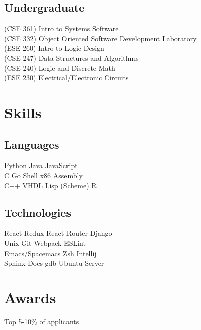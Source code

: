 \documentclass[]{deedy-resume-openfont}
\begin{document}
\begin{minipage}[t]{0.33\textwidth}
\subsection{Undergraduate}
(CSE 361) Intro to Systems Software\\
(CSE 332) Object Oriented Software Development Laboratory\\
(ESE 260) Intro to Logic Design\\
(CSE 247) Data Structures and Algorithms\\
(CSE 240) Logic and Discrete Math\\
(ESE 230) Electrical/Electronic Circuits\\
\sectionsep


\section{Skills}
\subsection{Languages}
Python \textbullet{} Java \textbullet{} JavaScript \\
C \textbullet{} Go \textbullet{} Shell \textbullet{} x86 Assembly \\
C++ \textbullet{} VHDL \textbullet{} Lisp (Scheme) \textbullet{} R\\
\sectionsep

\subsection{Technologies}
React \textbullet{} Redux \textbullet{} React-Router \textbullet{} Django \\
Unix \textbullet{} Git \textbullet{} Webpack \textbullet{} ESLint \\
Emacs/Spacemacs \textbullet{} Zsh \textbullet{} Intellij \\
Sphinx Docs \textbullet{} gdb \textbullet{} Ubuntu Server \\
\sectionsep


\section{Awards}
\vspace{\topsep} %
\begin{tightemize}
\item Top 5-10\% of applicants
\end{tightemize}


\end{minipage}
\end{document}
